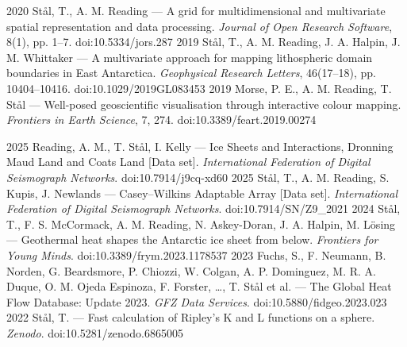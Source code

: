 \documentclass[11pt, a4paper]{cvClass}
\begin{document}
\begin{cvhonors}
    {}
    {}
  \cvhonor
    {2020}
    {Stål, T., A. M. Reading — A grid for multidimensional and multivariate spatial representation and data processing. \textit{Journal of Open Research Software}, 8(1), pp. 1–7. doi:10.5334/jors.287}
    {}
    {}
  \cvhonor
    {2019}
    {Stål, T., A. M. Reading, J. A. Halpin, J. M. Whittaker — A multivariate approach for mapping lithospheric domain boundaries in East Antarctica. \textit{Geophysical Research Letters}, 46(17–18), pp. 10404–10416. doi:10.1029/2019GL083453}
    {}
    {}
  \cvhonor
    {2019}
    {Morse, P. E., A. M. Reading, T. Stål — Well-posed geoscientific visualisation through interactive colour mapping. \textit{Frontiers in Earth Science}, 7, 274. doi:10.3389/feart.2019.00274}
    {}
    {}
\end{cvhonors}
\clearpage

\begin{cvhonors}
  \cvhonor
    {2025}
    {Reading, A. M., T. Stål, I. Kelly — Ice Sheets and Interactions, Dronning Maud Land and Coats Land [Data set]. \textit{International Federation of Digital Seismograph Networks}. doi:10.7914/j9cq-xd60}
    {}
    {}
  \cvhonor
    {2025}
    {Stål, T., A. M. Reading, S. Kupis, J. Newlands — Casey–Wilkins Adaptable Array [Data set]. \textit{International Federation of Digital Seismograph Networks}. doi:10.7914/SN/Z9\_2021}
    {}
    {}
  \cvhonor
    {2024}
    {Stål, T., F. S. McCormack, A. M. Reading, N. Askey-Doran, J. A. Halpin, M. Lösing — Geothermal heat shapes the Antarctic ice sheet from below. \textit{Frontiers for Young Minds}. doi:10.3389/frym.2023.1178537}
    {}
    {}
  \cvhonor
    {2023}
    {Fuchs, S., F. Neumann, B. Norden, G. Beardsmore, P. Chiozzi, W. Colgan, A. P. Dominguez, M. R. A. Duque, O. M. Ojeda Espinoza, F. Forster, \dots, T. Stål et al. — The Global Heat Flow Database: Update 2023. \textit{GFZ Data Services}. doi:10.5880/fidgeo.2023.023}
    {}
    {}
  \cvhonor
    {2022}
    {Stål, T. — Fast calculation of Ripley's K and L functions on a sphere. \textit{Zenodo}. doi:10.5281/zenodo.6865005}
    {}
    {}
\end{cvhonors}

\clearpage
{}
\end{document}
